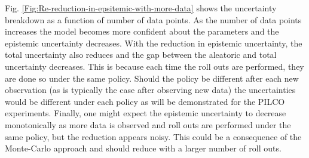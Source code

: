 Fig. \ref{Fig:Re-reduction-in-epsitemic-with-more-data} shows the uncertainty breakdown as a function of number of data points. As the number of data points increases the model becomes more confident about the parameters and the epistemic uncertainty decreases. With the reduction in epistemic uncertainty, the total uncertainty also reduces and the gap between the aleatoric and total uncertainty decreases. This is because each time the roll outs are performed, they are done so under the same policy. Should the policy be different after each new observation (as is typically the case after observing new data) the uncertainties would be different under each policy as will be demonstrated for the PILCO experiments. Finally, one might expect the epistemic uncertainty to decrease monotonically as more data is observed and roll outs are performed under the same policy, but the reduction appears noisy. This could be a consequence of the Monte-Carlo approach and should reduce with a larger number of roll outs.
 
